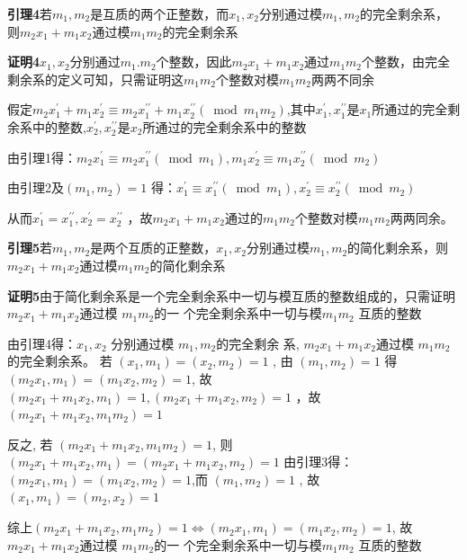 \documentclass[12pt,hyperref,a4paper,UTF8]{ctexart}
\begin{document}
\textbf{引理4}\quad 若$m_1,m_2$是互质的两个正整数，而$x_1,x_2$分别通过模$m_1,m_2$的完全剩余系，则$m_2x_1+m_1x_2$通过模$m_1m_2$的完全剩余系\par
\vskip 2pt
\textbf{证明4}\quad $x_1,x_2$分别通过$m_1.m_2$个整数，因此$m_2x_1+m_1x_2$通过$m_1m_2$个整数，由完全剩余系的定义可知，只需证明这$m_1m_2$个整数对模$m_1m_2$两两不同余\par 
假定$m_{2} x_{1}^{\prime}+m_{1} x_{2}^{\prime} \equiv m_{2} x_{1}^{\prime \prime}+m_{1} x_{2}^{\prime \prime}\left(\bmod m_{1} m_{2}\right)$,其中$x_{1}^{\prime}, x_{1}^{\prime \prime}$是$x_{1}$所通过的完全剩余系中的整数,$x_{2}^{\prime}, x_{2}^{\prime \prime}$是$x_2$所通过的完全剩余系中的整数\par 
由引理1得：$m_{2} x_{1}^{\prime} \equiv m_{2} x_{1}^{\prime \prime}\left(\bmod m_{1}\right), m_{1} x_{2}^{\prime} \equiv m_{1} x_{2}^{\prime \prime}\left(\bmod m_{2}\right) $\par 
由引理2及$\left(m_{1}, m_{2}\right)=1$  得：$  x_{1}^{\prime} \equiv x_{1}^{\prime \prime}\left(\bmod m_{1}\right), x_{2}^{\prime} \equiv x_{2}^{\prime \prime}   \left(\bmod m_{2}\right) $\par 从而$x_{1}^{\prime}=x_{1}^{\prime \prime}, x_{2}^{\prime}=x_{2}^{\prime \prime}$ ，故$m_2x_1+m_1x_2$通过的$m_1m_2$个整数对模$m_1m_2$两两同余。\par
\vskip 12pt

\textbf{引理5}\quad 若$m_1,m_2$是两个互质的正整数，$x_1,x_2$分别通过模$m_1,m_2$的简化剩余系，则$m_2x_1+m_1x_2$通过模$m_1m_2$的简化剩余系\par
\vskip 2pt
\textbf{证明5}\quad 由于简化剩余系是一个完全剩余系中一切与模互质的整数组成的，只需证明 $ m_{2} x_{1}+m_{1} x_{2}  $通过模 $ m_{1} m_{2}  $的一 个完全剩余系中一切与模$  m_{1} m_{2} $ 互质的整数\par
由引理4得：$x_{1}, x_{2} $ 分别通过模 $ m_{1}, m_{2}  $的完全剩余 系, $ m_{2} x_{1}+m_{1} x_{2}  $通过模 $ m_{1} m_{2} $ 的完全剩余系。 若 $ \left(x_{1}, m_{1}\right)  = \left(x_{2}, m_{2}\right)=1$ , 由 $ \left(m_{1}, m_{2}\right)=1 $ 得 $ \left(m_{2} x_{1}, m_{1}\right)=\left(m_{1} x_{2}\right. ,  \left.m_{2}\right)=1 $, 故  $\left(m_{2} x_{1}+m_{1} x_{2}, m_{1}\right)=1,\left(m_{2} x_{1}+m_{1} x_{2}, m_{2}\right)=1$ ，故$ \left(m_{2} x_{1}+m_{1} x_{2}, m_{1} m_{2}\right)=1 $\par  
反之, 若 $ \left(m_{2} x_{1}+m_{1} x_{2}, m_{1} m_{2}\right)=1 $, 则$  \left(m_{2} x_{1}+m_{1} x_{2}, m_{1}\right)=\left(m_{2} x_{1}+m_{1} x_{2}, m_{2}\right)=1$ 由引理3得：$  \left(m_{2} x_{1}, m_{1}\right)=\left(m_{1} x_{2}, m_{2}\right)=1 $,而 $\left(m_{1}, m_{2}\right)=1$ , 故 $ \left(x_{1}\right. ,  \left.m_{1}\right)=\left(m_{2}, x_{2}\right)=1$ \par 
综上$ \left(m_{2} x_{1}+m_{1} x_{2}, m_{1} m_{2}\right)=1 \iff \left(m_{2} x_{1}, m_{1}\right)=\left(m_{1} x_{2}\right. ,  \left.m_{2}\right)=1 $, 故   $ m_{2} x_{1}+m_{1} x_{2}  $通过模 $ m_{1} m_{2}  $的一 个完全剩余系中一切与模$  m_{1} m_{2} $ 互质的整数\par 
\vskip 12pt
\end{document}
